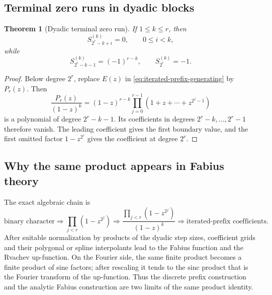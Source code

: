 \documentclass[11pt,oneside]{article}
\newtheorem{theorem}{Theorem}[section]
\theoremstyle{definition}
\theoremstyle{remark}
\begin{document}
\subsection{Terminal zero runs in dyadic blocks}

\begin{theorem}[Dyadic terminal zero run]\label{thm:terminal-zero-run}
If $1\le k\le r$, then
\begin{equation}\label{eq:terminal-zero-run}
 S_{2^r-k+i}^{(k)}=0,
 \qquad 0\le i<k,
\end{equation}
while
\begin{equation}\label{eq:terminal-boundaries}
 S_{2^r-k-1}^{(k)}=(-1)^{r-k},
 \qquad
 S_{2^r}^{(k)}=-1.
\end{equation}
\end{theorem}

\begin{proof}
Below degree $2^r$, replace $E(z)$ in
\cref{eq:iterated-prefix-generating} by $P_r(z)$.  Then
\begin{equation}\label{eq:prefix-polynomial-degree}
 \frac{P_r(z)}{(1-z)^k}
 =(1-z)^{r-k}
 \prod_{j=0}^{r-1}(1+z+\cdots+z^{2^j-1})
\end{equation}
is a polynomial of degree $2^r-k-1$.  Its coefficients in degrees
$2^r-k,\ldots,2^r-1$ therefore vanish.  The leading coefficient gives the
first boundary value, and the first omitted factor $1-z^{2^r}$ gives the
coefficient at degree $2^r$.
\end{proof}

\subsection{Why the same product appears in Fabius theory}

The exact algebraic chain is
\begin{equation}\label{eq:fabius-chain}
 \text{binary character}
 \Longrightarrow
 \prod_{j<r}(1-z^{2^j})
 \Longrightarrow
 \frac{\prod_{j<r}(1-z^{2^j})}{(1-z)^k}
 \Longrightarrow
 \text{iterated-prefix coefficients}.
\end{equation}
After suitable normalization by products of the dyadic step sizes, coefficient
grids and their polygonal or spline interpolants lead to the Fabius function
and the Rvachev up-function.  On the Fourier side, the same finite product
becomes a finite product of sine factors; after rescaling it tends to the sinc
product that is the Fourier transform of the up-function.  Thus the discrete
prefix construction and the analytic Fabius construction are two limits of the
same product identity.
\end{document}
